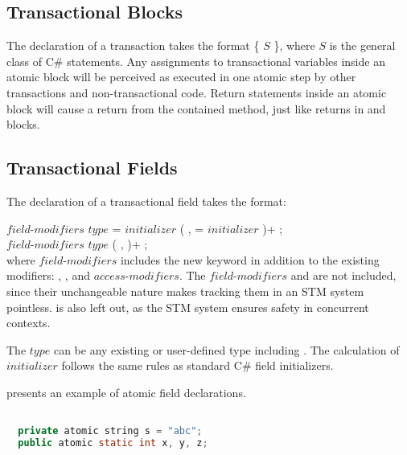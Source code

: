 \subsection{Transactional Blocks}
\label{subsec:design_atomic_block}
The declaration of a transaction takes the format  \{ $S$ \}, where $S$ is the general class of C\# statements. Any assignments to transactional variables inside an atomic block will be perceived as executed in one atomic step by other transactions and non-transactional code. Return statements inside an atomic block will cause a return from the contained method, just like returns in  and  blocks.
\subsection{Transactional Fields}\label{subsec:design_trans_field}
The declaration of a transactional field takes the format:

$field$-$modifiers$ $type$  = $initializer$ ( ,  = $initializer$ )+ ; \\
$field$-$modifiers$ $type$  ( ,  )+ ; \\

where $field$-$modifiers$ includes the new  keyword in addition to the existing modifiers: , , and $access$-$modifiers$\cite[p. 36]{sestoft2011c}. The $field$-$modifiers$  and  are not included, since their unchangeable nature makes tracking them in an \ac{STM} system pointless.  is also left out, as the \ac{STM} system ensures safety in concurrent contexts.

The $type$ can be any existing or user-defined type including . The calculation of $initializer$ follows the same rules as standard C\# field initializers\cite[p. 40]{sestoft2011c}.

 presents an example of atomic field declarations.

\begin{lstlisting}[label=lst:design_transactional_fields,
 caption={Local Transactional Variable},
 language=Java, 
 showspaces=false,
 showtabs=false,
 breaklines=true,
 showstringspaces=false,
 breakatwhitespace=true,
 commentstyle=\color{greencomments},
 keywordstyle=\color{bluekeywords},
 stringstyle=\color{redstrings},
 morekeywords={atomic, retry, orElse, var, get, set, string}]  % Start your code-block

  private atomic string s = "abc";
  public atomic static int x, y, z;
\end{lstlisting}

